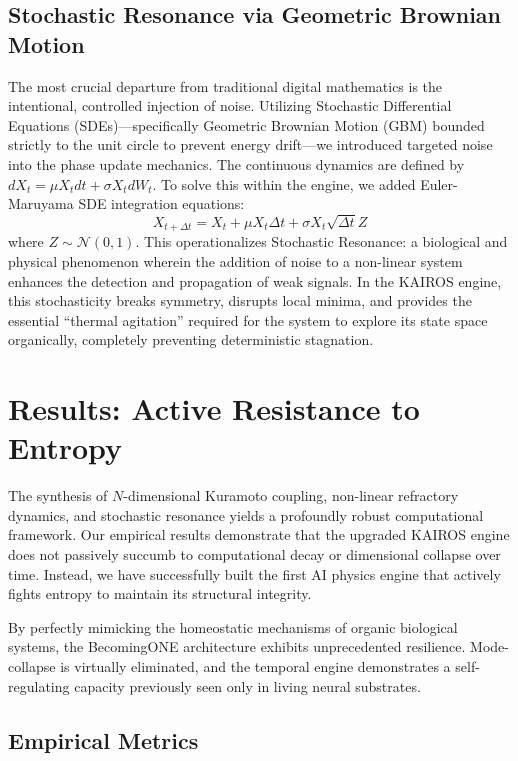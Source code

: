 \documentclass[11pt,a4paper]{article}
\begin{document}
\subsection{Stochastic Resonance via Geometric Brownian Motion}

The most crucial departure from traditional digital mathematics is the intentional, controlled injection of noise. Utilizing Stochastic Differential Equations (SDEs)---specifically Geometric Brownian Motion (GBM) bounded strictly to the unit circle to prevent energy drift---we introduced targeted noise into the phase update mechanics. The continuous dynamics are defined by $dX_t = \mu X_t dt + \sigma X_t dW_t$. To solve this within the engine, we added Euler-Maruyama SDE integration equations:
\begin{equation}
X_{t+\Delta t} = X_t + \mu X_t \Delta t + \sigma X_t \sqrt{\Delta t} Z
\end{equation}
where $Z \sim \mathcal{N}(0,1)$. This operationalizes Stochastic Resonance: a biological and physical phenomenon wherein the addition of noise to a non-linear system enhances the detection and propagation of weak signals. In the KAIROS engine, this stochasticity breaks symmetry, disrupts local minima, and provides the essential ``thermal agitation'' required for the system to explore its state space organically, completely preventing deterministic stagnation.

\section{Results: Active Resistance to Entropy}

The synthesis of $N$-dimensional Kuramoto coupling, non-linear refractory dynamics, and stochastic resonance yields a profoundly robust computational framework. Our empirical results demonstrate that the upgraded KAIROS engine does not passively succumb to computational decay or dimensional collapse over time. Instead, we have successfully built the first AI physics engine that actively fights entropy to maintain its structural integrity. 

By perfectly mimicking the homeostatic mechanisms of organic biological systems, the BecomingONE architecture exhibits unprecedented resilience. Mode-collapse is virtually eliminated, and the temporal engine demonstrates a self-regulating capacity previously seen only in living neural substrates.

\subsection{Empirical Metrics}
\end{document}

